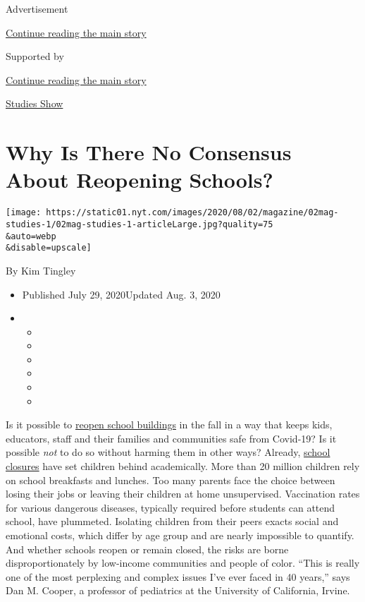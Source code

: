 Advertisement

\protect\hyperlink{after-top}{Continue reading the main story}

Supported by

\protect\hyperlink{after-sponsor}{Continue reading the main story}

\href{/column/studies-show}{Studies Show}

\hypertarget{why-is-there-no-consensus-about-reopening-schools}{%
\section{Why Is There No Consensus About Reopening
Schools?}\label{why-is-there-no-consensus-about-reopening-schools}}

\texttt{[image: https://static01.nyt.com/images/2020/08/02/magazine/02mag-studies-1/02mag-studies-1-articleLarge.jpg?quality=75\\\&auto=webp\\\&disable=upscale]}

By Kim Tingley

\begin{itemize}
\item
  Published July 29, 2020Updated Aug. 3, 2020
\item
  \begin{itemize}
  \item
  \item
  \item
  \item
  \item
  \item
  \end{itemize}
\end{itemize}

Is it possible to
\href{https://www.nytimes.com/2020/08/03/us/school-closing-coronavirus.html}{reopen
school buildings} in the fall in a way that keeps kids, educators, staff
and their families and communities safe from Covid-19? Is it possible
\emph{not} to do so without harming them in other ways? Already,
\href{https://www.nytimes.com/2020/07/29/health/covid-school-reopening.html}{school
closures} have set children behind academically. More than 20 million
children rely on school breakfasts and lunches. Too many parents face
the choice between losing their jobs or leaving their children at home
unsupervised. Vaccination rates for various dangerous diseases,
typically required before students can attend school, have plummeted.
Isolating children from their peers exacts social and emotional costs,
which differ by age group and are nearly impossible to quantify. And
whether schools reopen or remain closed, the risks are borne
disproportionately by low-income communities and people of color. ``This
is really one of the most perplexing and complex issues I've ever faced
in 40 years,'' says Dan M. Cooper, a professor of pediatrics at the
University of California, Irvine.

